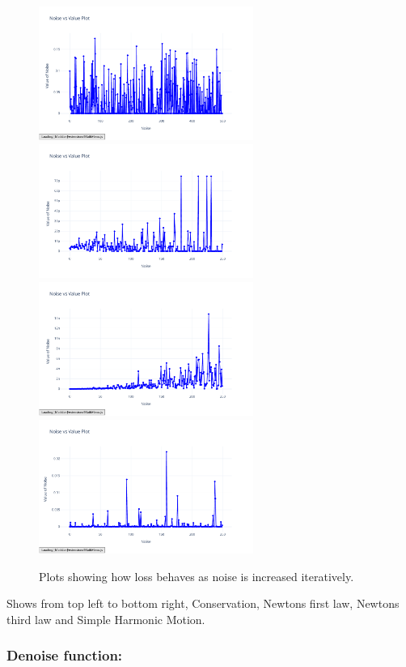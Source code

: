\documentclass{article}
\begin{document}
\begin{figure}[H]
    \centering
    \includegraphics[width=7cm]{noise_conservation_random_i}
    \includegraphics[width=7cm]{noise_Newtons_First_Law_random_i}
    \includegraphics[width=7cm]{noise_Newtons_Third_Law_random_i}
    \includegraphics[width=7cm]{noise_Simple_Harmonic_Motion_random_i}
    \caption{Plots showing how loss behaves as noise is increased iteratively.}
    \label{fig:noise_iterative_plots}
\end{figure}
Shows from top left to bottom right, Conservation, Newtons first law, Newtons third law and Simple Harmonic Motion. \\


\subsubsection{Denoise function: }
\end{document}

